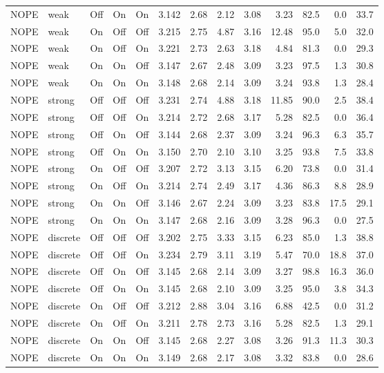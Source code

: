 \begin{longtable}{llcccrrrrrrrr}
NOPE & weak & Off & On & On & 3.142 & 2.68 & 2.12 & 3.08 & 3.23 & 82.5 & 0.0 & 33.7 \\
NOPE & weak & On & Off & Off & 3.215 & 2.75 & 4.87 & 3.16 & 12.48 & 95.0 & 5.0 & 32.0 \\
NOPE & weak & On & Off & On & 3.221 & 2.73 & 2.63 & 3.18 & 4.84 & 81.3 & 0.0 & 29.3 \\
NOPE & weak & On & On & Off & 3.147 & 2.67 & 2.48 & 3.09 & 3.23 & 97.5 & 1.3 & 30.8 \\
NOPE & weak & On & On & On & 3.148 & 2.68 & 2.14 & 3.09 & 3.24 & 93.8 & 1.3 & 28.4 \\
NOPE & strong & Off & Off & Off & 3.231 & 2.74 & 4.88 & 3.18 & 11.85 & 90.0 & 2.5 & 38.4 \\
NOPE & strong & Off & Off & On & 3.214 & 2.72 & 2.68 & 3.17 & 5.28 & 82.5 & 0.0 & 36.4 \\
NOPE & strong & Off & On & Off & 3.144 & 2.68 & 2.37 & 3.09 & 3.24 & 96.3 & 6.3 & 35.7 \\
NOPE & strong & Off & On & On & 3.150 & 2.70 & 2.10 & 3.10 & 3.25 & 93.8 & 7.5 & 33.8 \\
NOPE & strong & On & Off & Off & 3.207 & 2.72 & 3.13 & 3.15 & 6.20 & 73.8 & 0.0 & 31.4 \\
NOPE & strong & On & Off & On & 3.214 & 2.74 & 2.49 & 3.17 & 4.36 & 86.3 & 8.8 & 28.9 \\
NOPE & strong & On & On & Off & 3.146 & 2.67 & 2.24 & 3.09 & 3.23 & 83.8 & 17.5 & 29.1 \\
NOPE & strong & On & On & On & 3.147 & 2.68 & 2.16 & 3.09 & 3.28 & 96.3 & 0.0 & 27.5 \\
NOPE & discrete & Off & Off & Off & 3.202 & 2.75 & 3.33 & 3.15 & 6.23 & 85.0 & 1.3 & 38.8 \\
NOPE & discrete & Off & Off & On & 3.234 & 2.79 & 3.11 & 3.19 & 5.47 & 70.0 & 18.8 & 37.0 \\
NOPE & discrete & Off & On & Off & 3.145 & 2.68 & 2.14 & 3.09 & 3.27 & 98.8 & 16.3 & 36.0 \\
NOPE & discrete & Off & On & On & 3.145 & 2.68 & 2.10 & 3.09 & 3.25 & 95.0 & 3.8 & 34.3 \\
NOPE & discrete & On & Off & Off & 3.212 & 2.88 & 3.04 & 3.16 & 6.88 & 42.5 & 0.0 & 31.2 \\
NOPE & discrete & On & Off & On & 3.211 & 2.78 & 2.73 & 3.16 & 5.28 & 82.5 & 1.3 & 29.1 \\
NOPE & discrete & On & On & Off & 3.145 & 2.68 & 2.27 & 3.08 & 3.26 & 91.3 & 11.3 & 30.3 \\
NOPE & discrete & On & On & On & 3.149 & 2.68 & 2.17 & 3.08 & 3.32 & 83.8 & 0.0 & 28.6 \\

\end{longtable}
